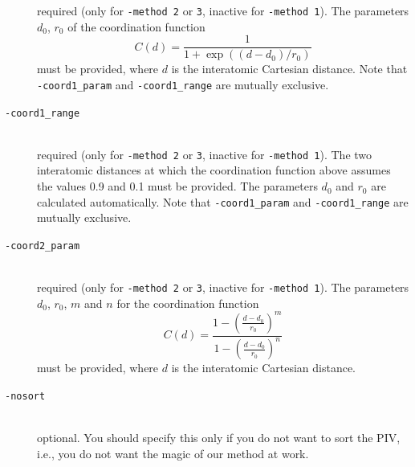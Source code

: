 \documentclass[a4paper,11pt]{article}
\begin{document}
\begin{description}
                                       {\color{red}required} (only for \texttt{-method 2} or \texttt{3}, inactive for \texttt{-method 1}). 
                                       The parameters $d_0$, $r_0$ of the coordination function 
                                       \begin{equation*}
                                         C(d)=\frac{1}{1+\exp((d-d_0)/r_0)}
                                       \end{equation*}
                                       must be provided, where $d$ is the interatomic Cartesian distance. 
                                       Note that \texttt{-coord1\_param} and \texttt{-coord1\_range} are mutually exclusive.
  \item[\texttt{-coord1\_range}     ]\hfill\\
                                       {\color{red}required} (only for \texttt{-method 2} or \texttt{3}, inactive for \texttt{-method 1}). 
                                       The two interatomic distances at which the coordination function above assumes the values 0.9 and 0.1 
                                       must be provided. 
                                       The parameters $d_0$ and $r_0$ are calculated automatically. 
                                       Note that \texttt{-coord1\_param} and \texttt{-coord1\_range} are mutually exclusive.
  \item[\texttt{-coord2\_param}     ]\hfill\\
                                       {\color{red}required} (only for \texttt{-method 2} or \texttt{3}, inactive for \texttt{-method 1}). 
                                       The parameters $d_0$, $r_0$, $m$ and $n$ for
                                       the coordination function 
                                       \begin{equation*}
                                         C(d)=\frac{1-\left(\frac{d-d_0}{r_0}\right)^m}{1-\left(\frac{d-d_0}{r_0}\right)^n}
                                       \end{equation*}
                                       must be provided, where $d$ is the interatomic Cartesian distance. 
  \item[\texttt{-nosort}            ] \hfill\\
                                       {\color{green}optional}. You should specify this only if you do not want to 
                                       sort the PIV, i.e.,  you do not want the magic of our method at work.

\end{description}
\end{document}
